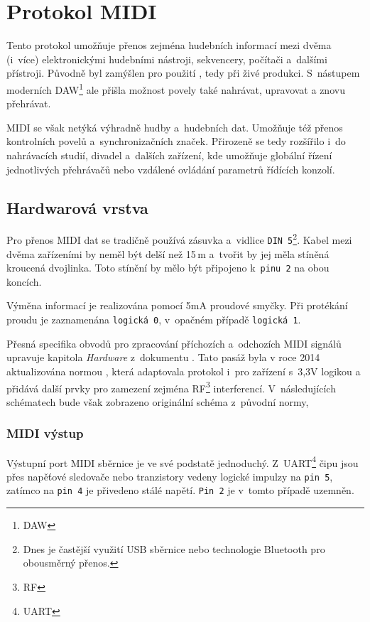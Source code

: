 \chapter{Protokol MIDI}\label{chpt:MIDI}

Tento protokol umožňuje přenos zejména hudebních informací mezi dvěma (i~více) elektronickými hudebními nástroji, sekvencery, počítači a~dalšími přístroji. Původně byl zamýšlen pro použití , tedy při živé produkci. \cite{MIDIspecs} S~nástupem moderních \acs{DAW}\footnote{\acl{DAW}} ale přišla možnost povely také nahrávat, upravovat a znovu přehrávat. 

\acs{MIDI} se však netýká výhradně hudby a~hudebních dat. Umožňuje též přenos kontrolních povelů a~synchronizačních značek. Přirozeně se tedy rozšířilo i~do nahrávacích studií, divadel a~dalších zařízení, kde umožňuje globální řízení jednotlivých přehrávačů nebo vzdálené ovládání parametrů řídících konzolí. 

\section{Hardwarová vrstva}
Pro přenos \acs{MIDI} dat se tradičně používá zásuvka a~vidlice \texttt{DIN~5}\footnote{Dnes je častější využití USB sběrnice nebo technologie Bluetooth pro obousměrný přenos.}.  Kabel mezi dvěma zařízeními by neměl být delší než 15\,\unit{m} a~tvořit by jej měla stíněná kroucená dvojlinka. Toto stínění by mělo být připojeno k~\texttt{pinu~2} na obou koncích. 

Výměna informací je realizována pomocí 5\unit{mA} proudové smyčky. Při protékání proudu je zaznamenána \texttt{logická~0}, v~opačném případě \texttt{logická~1}. \cite{MIDIspecs}

Přesná specifika obvodů pro zpracování příchozích a~odchozích \acs{MIDI} signálů upravuje kapitola \emph{Hardware} z~dokumentu \cite{MIDIspecs}. Tato pasáž byla v roce 2014 aktualizována normou \cite{MIDIupd}, která adaptovala protokol i~pro zařízení s~3,3\unit{V} logikou a přidává další prvky pro zamezení zejména \acs{RF}\footnote{\acl{RF}} interferencí. V~následujících schématech bude však zobrazeno originální schéma z~původní normy, 

\subsection{MIDI výstup}

Výstupní port \acs{MIDI} sběrnice je ve své podstatě jednoduchý. Z~\acs{UART}\footnote{\acl{UART}} čipu jsou přes napěťové sledovače nebo tranzistory vedeny logické impulzy na \texttt{pin~5}, zatímco na \texttt{pin~4} je přivedeno stálé napětí. \texttt{Pin~2} je v~tomto případě uzemněn. \cite{MIDIspecs}

